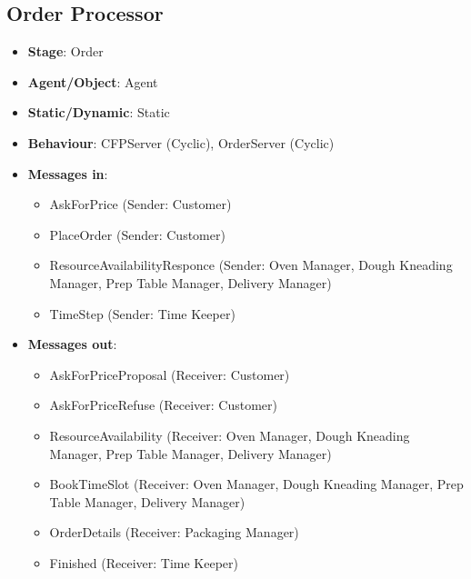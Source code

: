 \documentclass[12pt]{article}
\begin{document}
\subsection{Order Processor}%
\label{sub:order_processor}
\begin{itemize}
    \item \textbf{Stage}: Order
    \item \textbf{Agent/Object}: Agent
    \item \textbf{Static/Dynamic}: Static
    \item \textbf{Behaviour}: CFPServer (Cyclic), OrderServer (Cyclic)
    \item \textbf{Messages in}:
        \begin{itemize}
            \item AskForPrice (Sender: Customer)
            \item PlaceOrder (Sender: Customer)
            \item ResourceAvailabilityResponce (Sender: Oven Manager, Dough Kneading Manager, Prep Table Manager, Delivery Manager)
            \item TimeStep (Sender: Time Keeper)
        \end{itemize}
    \item \textbf{Messages out}:
        \begin{itemize}
            \item AskForPriceProposal (Receiver: Customer)
            \item AskForPriceRefuse (Receiver: Customer)
            \item ResourceAvailability (Receiver: Oven Manager, Dough Kneading Manager, Prep Table Manager, Delivery Manager)
            \item BookTimeSlot (Receiver: Oven Manager, Dough Kneading Manager, Prep Table Manager, Delivery Manager)
            \item OrderDetails (Receiver: Packaging Manager)
            \item Finished (Receiver: Time Keeper)
        \end{itemize}
\end{itemize}

\newpage{}
\end{document}
